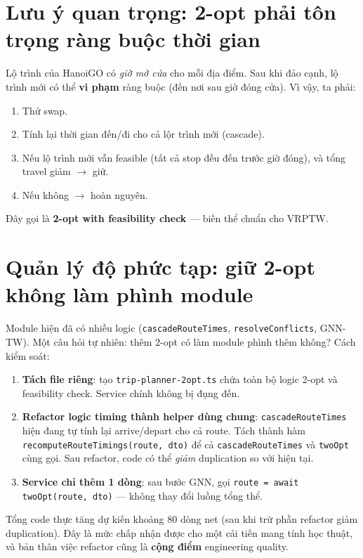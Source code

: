 \documentclass[12pt,a4paper]{report}
\begin{document}
\section{Lưu ý quan trọng: 2-opt phải tôn trọng ràng buộc thời gian}

Lộ trình của HanoiGO có \textit{giờ mở cửa} cho mỗi địa điểm. Sau khi đảo cạnh, lộ trình mới có thể \textbf{vi phạm} ràng buộc (đến nơi sau giờ đóng cửa). Vì vậy, ta phải:

\begin{enumerate}
    \item Thử swap.
    \item Tính lại thời gian đến/đi cho cả lộr trình mới (cascade).
    \item Nếu lộ trình mới vẫn feasible (tất cả stop đều đến trước giờ đóng), và tổng travel giảm $\rightarrow$ giữ.
    \item Nếu không $\rightarrow$ hoàn nguyên.
\end{enumerate}

Đây gọi là \textbf{2-opt with feasibility check} --- biến thể chuẩn cho VRPTW.

\section{Quản lý độ phức tạp: giữ 2-opt không làm phình module}

Module hiện đã có nhiều logic (\texttt{cascadeRouteTimes}, \texttt{resolveConflicts}, GNN-TW). Một câu hỏi tự nhiên: thêm 2-opt có làm module phình thêm không? Cách kiểm soát:

\begin{enumerate}[leftmargin=*]
    \item \textbf{Tách file riêng}: tạo \texttt{trip-planner-2opt.ts} chứa toàn bộ logic 2-opt và feasibility check. Service chính không bị đụng đến.
    \item \textbf{Refactor logic timing thành helper dùng chung}: \texttt{cascadeRouteTimes} hiện đang tự tính lại arrive/depart cho cả route. Tách thành hàm \texttt{recomputeRouteTimings(route, dto)} để cả \texttt{cascadeRouteTimes} và \texttt{twoOpt} cùng gọi. Sau refactor, code có thể \textit{giảm} duplication so với hiện tại.
    \item \textbf{Service chỉ thêm 1 dòng}: sau bước GNN, gọi \texttt{route = await twoOpt(route, dto)} --- không thay đổi luồng tổng thể.
\end{enumerate}

Tổng code thực tăng dự kiến khoảng 80 dòng net (sau khi trừ phần refactor giảm duplication). Đây là mức chấp nhận được cho một cải tiến mang tính học thuật, và bản thân việc refactor cũng là \textbf{cộng điểm} engineering quality.
\end{document}
